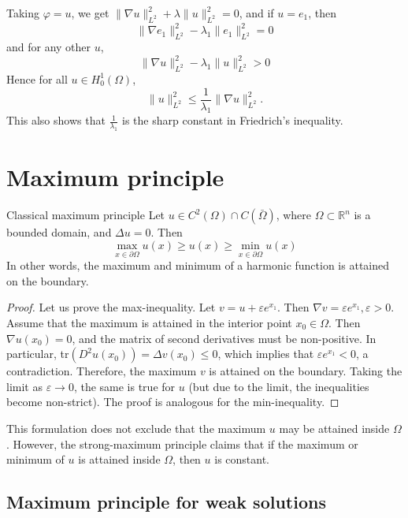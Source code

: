 \documentclass{report}
\begin{document}
\begin{enumerate}
    Taking \(\varphi = u\), we get \(\|\nabla u\|_{L^{2}}^{2} + \lambda\|u\|_{L^{2}}^{2} = 0\), and if \(u = e_{1}\), then 
    \[
        \|\nabla e_{1}\|_{L^{2}}^{2} - \lambda_{1}\|e_{1}\|_{L^{2}}^{2} = 0 
    \]
    and for any other \(u\),
    \[
        \|\nabla u\|_{L^{2}}^{2} - \lambda_{1}\|u\|_{L^{2}}^{2} > 0 
    \] 
    Hence for all \(u \in H^{1}_{0}(\Omega)\),
    \[
        \|u\|_{L^{2}}^{2} \leq \frac{1}{\lambda_{1}} \|\nabla u\|_{L^{2}}^{2}.
    \]
    This also shows that \(\frac{1}{\lambda_{1}}\) is the sharp constant in Friedrich's inequality.
\end{enumerate}

\section{Maximum principle}
\begin{theorem}{Classical maximum principle}{}
    Let \(u \in C^{2}(\Omega) \cap C(\bar{\Omega})\), where \(\Omega \subset \mathbb{R}^{n}\) is a bounded domain, and \(\Delta u = 0\). Then
    \[
        \max\limits_{x \in \partial \Omega} u(x) \geq u(x) \geq \min\limits_{x \in \partial \Omega} u(x)
    \]
    In other words, the maximum and minimum of a harmonic function is attained on the boundary.
\end{theorem}

\begin{proof}
    Let us prove the max-inequality. Let \(v = u + \varepsilon e^{x_{1}}\). Then \(\nabla v = \varepsilon e^{x_{1}}, \varepsilon > 0\). Assume that the maximum is attained in the interior point \(x_{0} \in \Omega\). Then \(\nabla u(x_{0}) = 0\), and the matrix of second derivatives must be non-positive. In particular, tr\((D^{2}u(x_{0})) = \Delta v(x_{0}) \leq 0\), which implies that \(\varepsilon e^{x_{1}} < 0\), a contradiction. Therefore, the maximum \(v\) is attained on the boundary. Taking the limit as \(\varepsilon \to 0\), the same is true for \(u\) (but due to the limit, the inequalities become non-strict). The proof is analogous for the min-inequality.
\end{proof}
This formulation does not exclude that the maximum \(u\) may be attained inside \(\Omega\). However, the strong-maximum principle claims that if the maximum or minimum of \(u\) is attained inside \(\Omega\), then \(u\) is constant.

\subsection*{Maximum principle for weak solutions}
\end{document}
